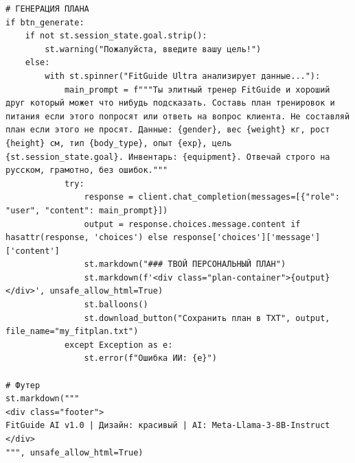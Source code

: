 \documentclass[14pt, a4paper]{extarticle}
\begin{document}
\begin{verbatim}
# ГЕНЕРАЦИЯ ПЛАНА
if btn_generate:
    if not st.session_state.goal.strip():
        st.warning("Пожалуйста, введите вашу цель!")
    else:
        with st.spinner("FitGuide Ultra анализирует данные..."):
            main_prompt = f"""Ты элитный тренер FitGuide и хороший друг который может что нибудь подсказать. Составь план тренировок и питания если этого попросят или ответь на вопрос клиента. Не составляй план если этого не просят. Данные: {gender}, вес {weight} кг, рост {height} см, тип {body_type}, опыт {exp}, цель {st.session_state.goal}. Инвентарь: {equipment}. Отвечай строго на русском, грамотно, без ошибок."""
            try:
                response = client.chat_completion(messages=[{"role": "user", "content": main_prompt}])
                output = response.choices.message.content if hasattr(response, 'choices') else response['choices']['message']['content']
                st.markdown("### ТВОЙ ПЕРСОНАЛЬНЫЙ ПЛАН")
                st.markdown(f'<div class="plan-container">{output}</div>', unsafe_allow_html=True)
                st.balloons()
                st.download_button("Сохранить план в TXT", output, file_name="my_fitplan.txt")
            except Exception as e:
                st.error(f"Ошибка ИИ: {e}")

# Футер
st.markdown("""
<div class="footer">
FitGuide AI v1.0 | Дизайн: красивый | AI: Meta-Llama-3-8B-Instruct
</div>
""", unsafe_allow_html=True)
\end{verbatim}
\end{document}
